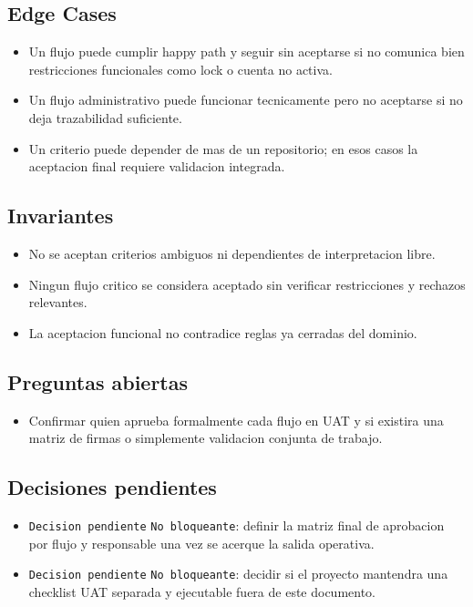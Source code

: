 \subsection{Edge Cases}

\begin{itemize}
  \item Un flujo puede cumplir happy path y seguir sin aceptarse si no comunica bien restricciones funcionales como lock o cuenta no activa.
  \item Un flujo administrativo puede funcionar tecnicamente pero no aceptarse si no deja trazabilidad suficiente.
  \item Un criterio puede depender de mas de un repositorio; en esos casos la aceptacion final requiere validacion integrada.
\end{itemize}

\subsection{Invariantes}

\begin{itemize}
  \item No se aceptan criterios ambiguos ni dependientes de interpretacion libre.
  \item Ningun flujo critico se considera aceptado sin verificar restricciones y rechazos relevantes.
  \item La aceptacion funcional no contradice reglas ya cerradas del dominio.
\end{itemize}

\subsection{Preguntas abiertas}

\begin{itemize}
  \item Confirmar quien aprueba formalmente cada flujo en UAT y si existira una matriz de firmas o simplemente validacion conjunta de trabajo.
\end{itemize}

\subsection{Decisiones pendientes}

\begin{itemize}
  \item \texttt{Decision pendiente} \texttt{No bloqueante}: definir la matriz final de aprobacion por flujo y responsable una vez se acerque la salida operativa.
  \item \texttt{Decision pendiente} \texttt{No bloqueante}: decidir si el proyecto mantendra una checklist UAT separada y ejecutable fuera de este documento.
\end{itemize}
